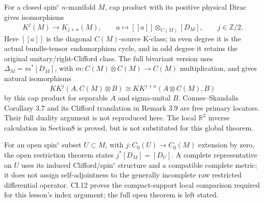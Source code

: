 \documentclass[
  11pt,
]{article}
\begin{document}
For a closed spin\(^{c}\) \(n\)-manifold \(M\), cap product with its
positive physical Dirac gives isomorphisms \[
 K^j(M)\longrightarrow K_{j+n}(M),\qquad
 a\longmapsto[\![a]\!]\otimes_{C(M)}[D_M],\qquad j\in\mathbb Z/2.
\] Here \([\![a]\!]\) is the diagonal \(C(M)\)-source K-class; in even
degree it is the actual bundle-tensor endomorphism cycle, and in odd
degree it retains the original unitary/right-Clifford class. The full
bivariant version uses \(\Delta_M=m^*[D_M]\), with
\(m:C(M)\otimes C(M)\to C(M)\) multiplication, and gives natural
isomorphisms \[
 KK^j(A,C(M)\otimes B)\cong KK^{j+n}(A\otimes C(M),B)
\] by this cap product for separable \(A\) and sigma-unital \(B\).
Connes--Skandalis Corollary 3.7 and its Clifford translation in Remark
3.9 are free primary locators. Their full duality argument is not
reproduced here. The local \(\mathbb R^2\) inverse calculation in
Section8 is proved, but is not substituted for this global theorem.

For an open spin\(^{c}\) subset \(U\subset M\), with
\(j:C_0(U)\to C_0(M)\) extension by zero, the open restriction theorem
states \(j^*[D_M]=[D_U]\). A complete representative on \(U\) uses its
induced Clifford/spin\(^{c}\) structure and a compatible complete
metric; it does not assign self-adjointness to the generally incomplete
raw restricted differential operator. CI.12 proves the compact-support
local comparison required for this lesson's index argument; the full
open theorem is left stated.
\end{document}
